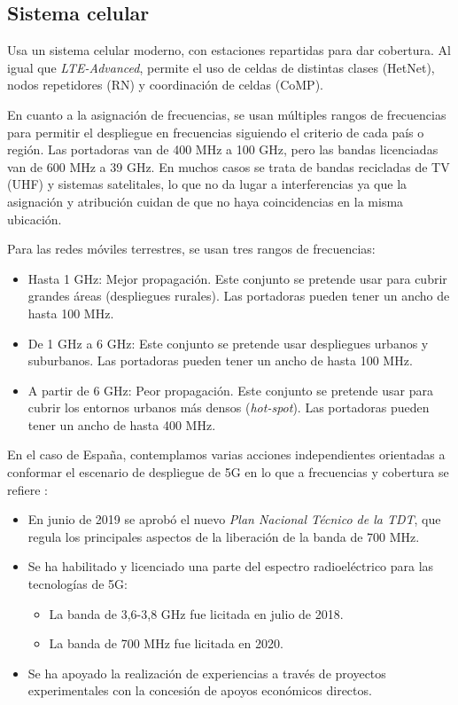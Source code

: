 \documentclass[12pt]{report} %
\begin{document}
\subsection{Sistema celular}

Usa un sistema celular moderno, con estaciones repartidas para dar cobertura.
Al igual que \textit{LTE-Advanced}, permite el uso de celdas de distintas clases (HetNet), nodos repetidores (RN) y coordinación de celdas (CoMP).
\cite{RefWorks:47}

En cuanto a la asignación de frecuencias, se usan múltiples rangos de frecuencias para permitir el despliegue en frecuencias siguiendo el criterio de cada país o región.
Las portadoras van de 400 MHz a 100 GHz, pero las bandas licenciadas van de 600 MHz a 39 GHz.
En muchos casos se trata de bandas recicladas de TV (UHF) y sistemas satelitales,
lo que no da lugar a interferencias ya que la asignación y atribución cuidan de que no haya coincidencias en la misma ubicación.

Para las redes móviles terrestres, se usan tres rangos de frecuencias:
\begin{itemize}
\item Hasta 1 GHz: Mejor propagación.
Este conjunto se pretende usar para cubrir grandes áreas (despliegues rurales).
Las portadoras pueden tener un ancho de hasta 100 MHz.
\item De 1 GHz a 6 GHz: Este conjunto se pretende usar despliegues urbanos y suburbanos.
Las portadoras pueden tener un ancho de hasta 100 MHz.
\item A partir de 6 GHz: Peor propagación.
Este conjunto se pretende usar para cubrir los entornos urbanos más densos (\textit{hot-spot}).
Las portadoras pueden tener un ancho de hasta 400 MHz.
\end{itemize}

En el caso de España, contemplamos varias acciones independientes orientadas a conformar el escenario de despliegue de 5G en lo que a frecuencias y cobertura se refiere \cite{RefWorks:72}:

\begin{itemize}
\item En junio de 2019 se aprobó el nuevo \textit{Plan Nacional Técnico de la TDT}, que regula los principales aspectos de la liberación de la banda de 700 MHz.
\item {
Se ha habilitado y licenciado una parte del espectro radioeléctrico para las tecnologías de 5G:
\begin{itemize}
\item La banda de 3,6-3,8 GHz fue licitada en julio de 2018.
\item La banda de 700 MHz fue licitada en 2020.
\end{itemize}
}
\item Se ha apoyado la realización de experiencias a través de proyectos experimentales con la concesión
de apoyos económicos directos.
\end{itemize}
\end{document}
